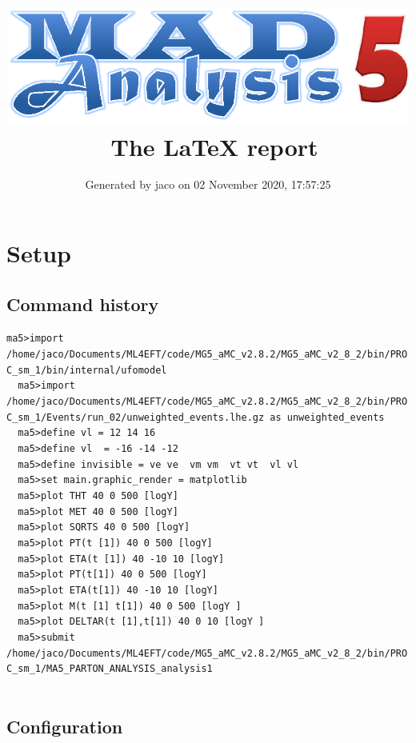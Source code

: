 \documentclass[a4paper, 10pt]{article}
\title{{\includegraphics[scale=.4]{logo.eps}}\ The LaTeX report}
\author{Generated by jaco on 02 November 2020, 17:57:25}
\begin{document}
\maketitle
\flushbottom

\newpage
\section{ Setup}

\subsection{ Command history}

\texttt{ma5>import /\-home/\-jaco/\-Documents/\-ML4EFT/\-code/\-MG5\_aMC\_v2.8.2/\-MG5\_aMC\_v2\_8\_2/\-bin/\-PROC\_sm\_1/\-bin/\-internal/\-ufomodel\\
}
\texttt{ }\texttt{ }\texttt{ma5>import /\-home/\-jaco/\-Documents/\-ML4EFT/\-code/\-MG5\_aMC\_v2.8.2/\-MG5\_aMC\_v2\_8\_2/\-bin/\-PROC\_sm\_1/\-Events/\-run\_02/\-unweighted\_events.lhe.gz as unweighted\_events\\
}
\texttt{ }\texttt{ }\texttt{ma5>define vl = 12 14 16\\
}
\texttt{ }\texttt{ }\texttt{ma5>define vl~ = -16 -14 -12\\
}
\texttt{ }\texttt{ }\texttt{ma5>define invisible = ve ve~ vm vm~ vt vt~ vl vl~\\
}
\texttt{ }\texttt{ }\texttt{ma5>set main.graphic\_render = matplotlib\\
}
\texttt{ }\texttt{ }\texttt{ma5>plot THT   40 0 500 [logY]\\
}
\texttt{ }\texttt{ }\texttt{ma5>plot MET   40 0 500 [logY]\\
}
\texttt{ }\texttt{ }\texttt{ma5>plot SQRTS 40 0 500 [logY]\\
}
\texttt{ }\texttt{ }\texttt{ma5>plot  PT(t~[1]) 40 0  500 [logY]\\
}
\texttt{ }\texttt{ }\texttt{ma5>plot ETA(t~[1]) 40 -10 10 [logY]\\
}
\texttt{ }\texttt{ }\texttt{ma5>plot  PT(t[1]) 40 0  500 [logY]\\
}
\texttt{ }\texttt{ }\texttt{ma5>plot ETA(t[1]) 40 -10 10 [logY]\\
}
\texttt{ }\texttt{ }\texttt{ma5>plot M(t~[1] t[1]) 40 0  500 [logY ]\\
}
\texttt{ }\texttt{ }\texttt{ma5>plot DELTAR(t~[1],t[1]) 40 0 10 [logY ]\\
}
\texttt{ }\texttt{ }\texttt{ma5>submit /\-home/\-jaco/\-Documents/\-ML4EFT/\-code/\-MG5\_aMC\_v2.8.2/\-MG5\_aMC\_v2\_8\_2/\-bin/\-PROC\_sm\_1/\-MA5\_PARTON\_ANALYSIS\_analysis1\\
}
\texttt{ }\texttt{ }\subsection{ Configuration}
\end{document}
